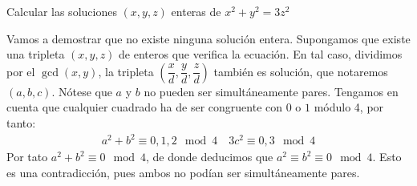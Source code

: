 \documentclass[twoside]{article}
\newenvironment{ejercicio}[2][Estado]{\begin{trivlist}
\item[\hskip \labelsep {\bfseries Ejercicio}\hskip \labelsep {\bfseries #2.}]}{\end{trivlist}}
\newenvironment{solucion}{\begin{trivlist}
\item[\hskip \labelsep {\textit{Solución}.}\hskip \labelsep]}{\end{trivlist}}
\numberwithin{equation}{section}
\begin{document}
\newpage
\begin{ejercicio}{3}
Calcular las soluciones $(x,y,z)$ enteras de $x^2+y^2=3z^2$
\begin{solucion}
Vamos a demostrar que no existe ninguna solución entera. Supongamos que existe una tripleta $(x,y,z)$ de enteros que verifica la ecuación. En tal caso, dividimos por el $\gcd(x,y)$, la tripleta $\left(\dfrac{x}{d},\dfrac{y}{d},\dfrac{z}{d}\right)$ también es solución, que notaremos $(a,b,c)$. Nótese que $a$ y $b$ no pueden ser simultáneamente pares. Tengamos en cuenta que cualquier cuadrado ha de ser congruente con $0$ o $1$ módulo 4, por tanto:
\begin{align*}
a^2+b^2 \equiv 0,1,2 \mod 4 \quad 3c^2 \equiv 0, 3 \mod 4
\end{align*}
Por tato $a^2+b^2 \equiv 0 \mod 4$, de donde deducimos que $a^2 \equiv b^2 \equiv 0 \mod 4$. Esto es una contradicción, pues ambos no podían ser simultáneamente pares.
\end{solucion}
\end{ejercicio}
\end{document}
